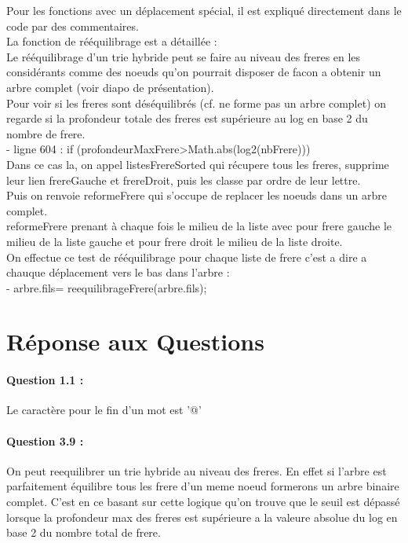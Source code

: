 \documentclass{article}
\begin{document}
Pour les fonctions avec un d\'eplacement sp\'ecial, il est expliqu\'e directement dans
 le code par des commentaires.\\

La fonction de r\'e\'equilibrage est a d\'etaill\'ee :\\
Le r\'e\'equilibrage d'un trie hybride peut se faire au niveau des freres en les
consid\'erants comme des noeuds qu'on pourrait disposer de facon a obtenir un
arbre complet (voir diapo de pr\'esentation).\\
Pour voir si les freres sont d\'es\'equilibr\'es (cf. ne forme pas un arbre complet)
on regarde si la profondeur totale des freres est sup\'erieure au log en base 2 du
nombre de frere.\\
- ligne 604 : if (profondeurMaxFrere>Math.abs(log2(nbFrere)))\\
Dans ce cas la, on appel listesFrereSorted qui r\'ecupere tous les freres, supprime
leur lien frereGauche et frereDroit, puis les classe par ordre de leur lettre.\\
Puis on renvoie reformeFrere qui s'occupe de replacer les noeuds dans un arbre
complet.\\
reformeFrere prenant à chaque fois le milieu de la liste avec pour frere gauche
le milieu de la liste gauche et pour frere droit le milieu de la liste droite.\\
On effectue ce test de r\'e\'equilibrage pour chaque liste de frere c'est a dire a
chauque d\'eplacement vers le bas dans l'arbre :\\
- arbre.fils= reequilibrageFrere(arbre.fils);\\

\newpage

\section{R\'eponse aux Questions}

\paragraph{Question 1.1 : }

Le caract\`ere pour le fin d'un mot est '@'

\paragraph{Question 3.9 :}

On peut reequilibrer un trie hybride au niveau des freres.
En effet si l'arbre est parfaitement \'equilibre tous les frere d'un meme noeud
formerons un arbre binaire complet. C'est en ce basant sur cette logique qu'on
trouve que le seuil est d\'epass\'e lorsque la profondeur max des freres
est sup\'erieure a la valeure absolue du log en base 2 du nombre total de frere.\\
\end{document}

